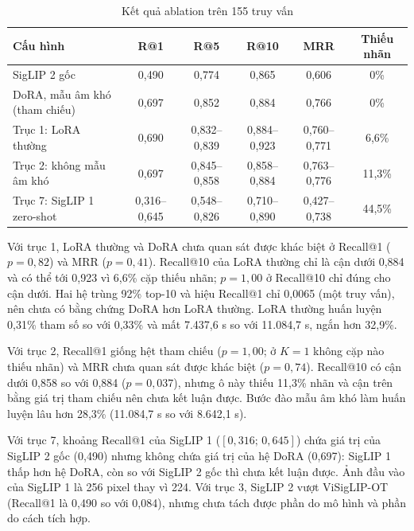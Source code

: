 \begin{table}[H]
\centering
\caption{Kết quả ablation trên 155 truy vấn}
\label{tab:ablation}
\footnotesize
\renewcommand{\arraystretch}{1.12}
\setlength{\tabcolsep}{4pt}
\begin{tabularx}{\textwidth}{@{}>{\raggedright\arraybackslash}X c c c c c@{}}
\toprule
\textbf{Cấu hình} & \textbf{R@1} & \textbf{R@5} & \textbf{R@10} & \textbf{MRR} & \textbf{Thiếu nhãn} \\
\midrule
SigLIP 2 gốc & 0,490 & 0,774 & 0,865 & 0,606 & 0\% \\
DoRA, mẫu âm khó (tham chiếu) & 0,697 & 0,852 & 0,884 & 0,766 & 0\% \\
Trục 1: LoRA thường & 0,690 & 0,832--0,839 & 0,884--0,923 & 0,760--0,771 & 6,6\% \\
Trục 2: không mẫu âm khó & 0,697 & 0,845--0,858 & 0,858--0,884 & 0,763--0,776 & 11,3\% \\
Trục 7: SigLIP 1 zero-shot & 0,316--0,645 & 0,548--0,826 & 0,710--0,890 & 0,427--0,738 & 44,5\% \\
\bottomrule
\end{tabularx}
\end{table}

Với trục 1, LoRA thường và DoRA chưa quan sát được khác biệt ở Recall@1 ($p = 0{,}82$) và MRR ($p = 0{,}41$). Recall@10 của LoRA thường chỉ là cận dưới 0,884 và có thể tới 0,923 vì 6,6\% cặp thiếu nhãn; $p = 1{,}00$ ở Recall@10 chỉ đúng cho cận dưới. Hai hệ trùng 92\% top-10 và hiệu Recall@1 chỉ 0,0065 (một truy vấn), nên chưa có bằng chứng DoRA hơn LoRA thường. LoRA thường huấn luyện 0,31\% tham số so với 0,33\% và mất 7.437,6 s so với 11.084,7 s, ngắn hơn 32,9\%.

Với trục 2, Recall@1 giống hệt tham chiếu ($p = 1{,}00$; ở $K = 1$ không cặp nào thiếu nhãn) và MRR chưa quan sát được khác biệt ($p = 0{,}74$). Recall@10 có cận dưới 0,858 so với 0,884 ($p = 0{,}037$), nhưng ô này thiếu 11,3\% nhãn và cận trên bằng giá trị tham chiếu nên chưa kết luận được. Bước đào mẫu âm khó làm huấn luyện lâu hơn 28,3\% (11.084,7 s so với 8.642,1 s).

Với trục 7, khoảng Recall@1 của SigLIP 1 ($[0{,}316;\,0{,}645]$) chứa giá trị của SigLIP 2 gốc (0,490) nhưng không chứa giá trị của hệ DoRA (0,697): SigLIP 1 thấp hơn hệ DoRA, còn so với SigLIP 2 gốc thì chưa kết luận được. Ảnh đầu vào của SigLIP 1 là 256 pixel thay vì 224. Với trục 3, SigLIP 2 vượt ViSigLIP-OT (Recall@1 là 0,490 so với 0,084), nhưng chưa tách được phần do mô hình và phần do cách tích hợp.

